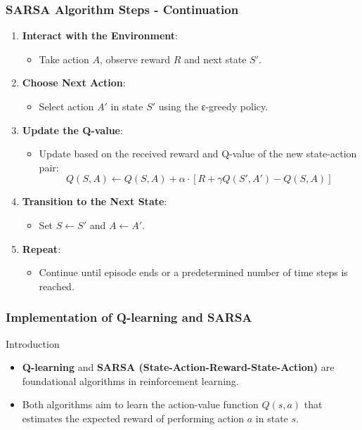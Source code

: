 \documentclass{beamer}
\begin{document}
\begin{frame}[fragile]
    \frametitle{SARSA Algorithm Steps - Continuation}
    \begin{enumerate}[resume]
        \item \textbf{Interact with the Environment}:
            \begin{itemize}
                \item Take action \( A \), observe reward \( R \) and next state \( S' \).
            \end{itemize}
        \item \textbf{Choose Next Action}:
            \begin{itemize}
                \item Select action \( A' \) in state \( S' \) using the ε-greedy policy.
            \end{itemize}
        \item \textbf{Update the Q-value}:
            \begin{itemize}
                \item Update based on the received reward and Q-value of the new state-action pair:
                \[
                Q(S, A) \leftarrow Q(S, A) + \alpha \cdot \left[ R + \gamma Q(S', A') - Q(S, A) \right]
                \]
            \end{itemize}
        \item \textbf{Transition to the Next State}:
            \begin{itemize}
                \item Set \( S \leftarrow S' \) and \( A \leftarrow A' \).
            \end{itemize}
        \item \textbf{Repeat}:
            \begin{itemize}
                \item Continue until episode ends or a predetermined number of time steps is reached.
            \end{itemize}
    \end{enumerate}
\end{frame}

\begin{frame}
    \frametitle{Implementation of Q-learning and SARSA}
    \begin{block}{Introduction}
    \begin{itemize}
        \item \textbf{Q-learning} and \textbf{SARSA (State-Action-Reward-State-Action)} are foundational algorithms in reinforcement learning.
        \item Both algorithms aim to learn the action-value function \( Q(s, a) \) that estimates the expected reward of performing action \( a \) in state \( s \).
    \end{itemize}
    \end{block}
\end{frame}
\end{document}
